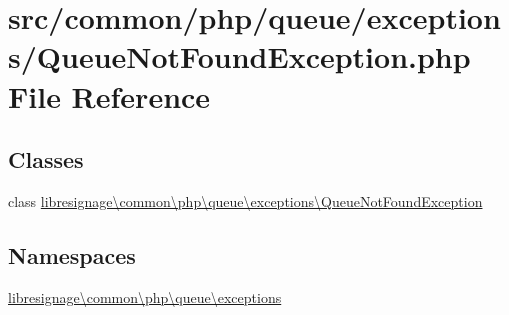 \hypertarget{QueueNotFoundException_8php}{}\section{src/common/php/queue/exceptions/\+Queue\+Not\+Found\+Exception.php File Reference}
\label{QueueNotFoundException_8php}
\subsection*{Classes}
\begin{DoxyCompactItemize}
\item 
class \hyperlink{classlibresignage_1_1common_1_1php_1_1queue_1_1exceptions_1_1QueueNotFoundException}{libresignage\textbackslash{}common\textbackslash{}php\textbackslash{}queue\textbackslash{}exceptions\textbackslash{}\+Queue\+Not\+Found\+Exception}
\end{DoxyCompactItemize}
\subsection*{Namespaces}
\begin{DoxyCompactItemize}
\item 
 \hyperlink{namespacelibresignage_1_1common_1_1php_1_1queue_1_1exceptions}{libresignage\textbackslash{}common\textbackslash{}php\textbackslash{}queue\textbackslash{}exceptions}
\end{DoxyCompactItemize}
